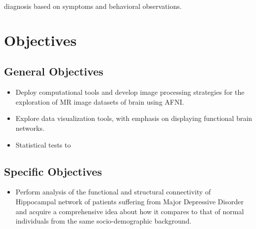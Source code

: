 \documentclass{article}
\begin{document}
diagnosis based on symptoms and behavioral observations.

\newpage

\section{Objectives}

\subsection{General Objectives}

\begin{itemize}

  \item Deploy computational tools and develop image processing
    strategies for the exploration of MR image datasets of brain using
    AFNI.

  \item Explore data visualization tools, with emphasis on displaying
    functional brain networks.

  \item Statistical tests to

\end{itemize}


\subsection{Specific Objectives}

\begin{itemize}

  \item Perform analysis of the functional and structural connectivity
    of Hippocampal network of patients suffering from Major Depressive
    Disorder and acquire a comprehensive idea about how it compares to
    that of normal individuals from the same socio-demographic
    background.

\end{itemize}


\end{document}
